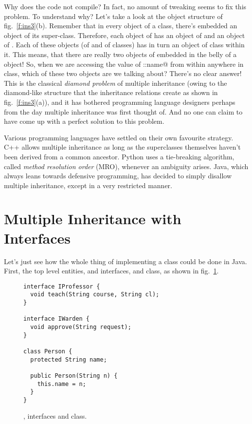 \documentclass[12pt,a4paper]{article}
\begin{document}
Why does the code not compile? In fact, no amount of tweaking seems to fix this problem. To understand why? Let's take a look at the object structure of fig.~\ref{f:ins3}(b). Remember that in every object of a class, there's embedded an object of its super-class. Therefore, each object of \lstinline@ProfessorWarden@ has an object of \lstinline@Professor@ and an object of \lstinline@Warden@. Each of these objects (of \lstinline@Professor@ and of \lstinline@Warden@ classes) has in turn an object of \lstinline@Person@ class within it. This means, that there are really two objects of \lstinline@Person@ embedded in the belly of a \lstinline@ProfessorWarden@ object! So, when we are accessing the value of \lstinline@Person::name@ from within anywhere in \lstinline@ProfessorWarden@ class, which of these two \lstinline@Person@ objects are we talking about? There's no clear answer! This is the classical \emph{diamond problem} of multiple inheritance (owing to the diamond-like structure that the inheritance relations create as shown in fig.~\ref{f:ins3}(a)), and it has bothered programming language designers perhaps from the day multiple inheritance was first thought of. And no one can claim to have come up with a perfect solution to this problem.

Various programming languages have settled on their own favourite strategy. C++ allows multiple inheritance as long as the superclasses themselves haven't been derived from a common ancestor. Python uses a tie-breaking algorithm, called \emph{method resolution order} (MRO), whenever an ambiguity arises. Java, which always leans towards defensive programming, has decided to simply disallow multiple inheritance, except in a very restricted manner.

\section{Multiple Inheritance with Interfaces}
Let's just see how the whole thing of implementing a \lstinline@ProfessorWarden@ class could be done in Java. First, the top level entities, \lstinline@IProfessor@ and \lstinline@IWarden@ interfaces, and \lstinline@Person@ class, as shown in fig.~\ref{f:mij1}.

\begin{figure}[H]
\begin{lstlisting}[frame=single]
interface IProfessor {
  void teach(String course, String cl);
}

interface IWarden {
  void approve(String request);
}

class Person {
  protected String name;

  public Person(String n) {
    this.name = n;
  }
}
\end{lstlisting}
\caption{\lstinline@IProfessor@, \lstinline@IWarden@ interfaces and \lstinline@Person@ class.}
\label{f:mij1}
\end{figure}
\end{document}
